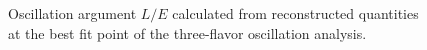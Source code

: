 %     
%     

\begin{figure}
    \centering
    
    \caption{Oscillation argument $L/E$ calculated from reconstructed quantities at the best fit point of the three-flavor oscillation analysis.}
    \label{fig:data_mc_post_fit_l_over_e}
\end{figure}


